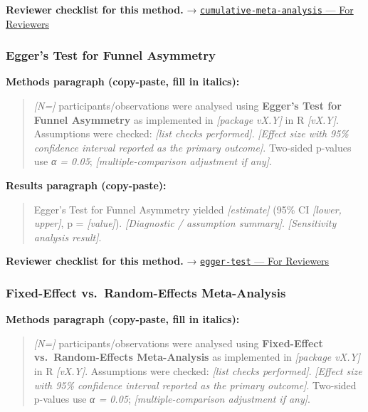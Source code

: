 \documentclass[
]{article}
\begin{document}
\textbf{Reviewer checklist for this method.} →
\href{../chapters/15-metaanalysis/cumulative-meta-analysis.Rmd\#for-reviewers}{\texttt{cumulative-meta-analysis}
--- For Reviewers}

\subsubsection{Egger's Test for Funnel
Asymmetry}\label{eggers-test-for-funnel-asymmetry}

\textbf{Methods paragraph (copy-paste, fill in italics):}

\begin{quote}
\emph{{[}N={]}} participants/observations were analysed using
\textbf{Egger's Test for Funnel Asymmetry} as implemented in
\emph{{[}package vX.Y{]}} in R \emph{{[}vX.Y{]}}. Assumptions were
checked: \emph{{[}list checks performed{]}}. \emph{{[}Effect size with
95\% confidence interval reported as the primary outcome{]}}. Two-sided
p-values use \emph{α = 0.05}; \emph{{[}multiple-comparison adjustment if
any{]}}.
\end{quote}

\textbf{Results paragraph (copy-paste):}

\begin{quote}
Egger's Test for Funnel Asymmetry yielded \emph{{[}estimate{]}} (95\% CI
\emph{{[}lower, upper{]}}, p = \emph{{[}value{]}}). \emph{{[}Diagnostic
/ assumption summary{]}}. \emph{{[}Sensitivity analysis result{]}}.
\end{quote}

\textbf{Reviewer checklist for this method.} →
\href{../chapters/15-metaanalysis/egger-test.Rmd\#for-reviewers}{\texttt{egger-test}
--- For Reviewers}

\subsubsection{Fixed-Effect vs.~Random-Effects
Meta-Analysis}\label{fixed-effect-vs.-random-effects-meta-analysis}

\textbf{Methods paragraph (copy-paste, fill in italics):}

\begin{quote}
\emph{{[}N={]}} participants/observations were analysed using
\textbf{Fixed-Effect vs.~Random-Effects Meta-Analysis} as implemented in
\emph{{[}package vX.Y{]}} in R \emph{{[}vX.Y{]}}. Assumptions were
checked: \emph{{[}list checks performed{]}}. \emph{{[}Effect size with
95\% confidence interval reported as the primary outcome{]}}. Two-sided
p-values use \emph{α = 0.05}; \emph{{[}multiple-comparison adjustment if
any{]}}.
\end{quote}
\end{document}

